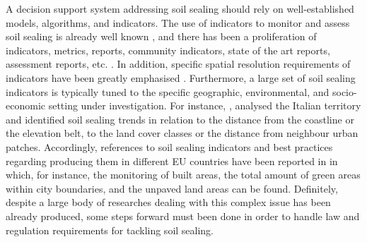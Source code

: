 \documentclass[APA,LATO1COL,doublespace]{WileyNJD-v2}
\begin{document}
A decision support system addressing soil sealing should rely on well-established models, algorithms, and indicators. The use of indicators to monitor and assess soil sealing is already well known \citep{King16}, and there has been a proliferation of indicators, metrics, reports, community indicators, state of the art reports, assessment reports, etc. \citep{Maclaren96,Tanguay10}.
In addition, specific spatial resolution requirements of indicators have been greatly emphasised \citep{Jaeger08}.
Furthermore, a large set of soil sealing indicators is typically tuned to the specific geographic, environmental, and socio-economic setting under investigation.
For instance, \citet{Munafo13}, analysed the Italian territory and identified soil sealing trends in relation to the distance from the coastline or the elevation belt, to the land cover classes or the distance from neighbour urban patches.
Accordingly, references to soil sealing indicators and best practices regarding producing them in different EU countries have been reported in \citep{EC2011b} in which, for instance, the monitoring of built areas, the total amount of green areas within city boundaries, and the unpaved land areas can be found.
Definitely, despite a large body of researches dealing with this complex issue has been already produced, some steps forward must been done in order to handle law and regulation requirements for tackling soil sealing.
\end{document}
